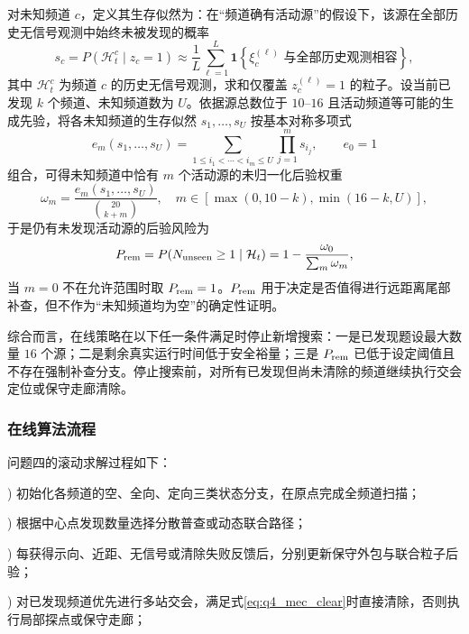 \documentclass[zihao=-4,a4paper,UTF8,fontset=none]{ctexart}
\begin{document}
对未知频道 $c$，定义其生存似然为：在“频道确有活动源”的假设下，该源在全部历史无信号观测中始终未被发现的概率
\begin{equation}
s_c=P(\mathcal H_t^c\mid z_c=1)
\approx\frac{1}{L}\sum_{\ell=1}^{L}
\mathbf 1\!\left\{\xi_c^{(\ell)}\text{ 与全部历史观测相容}\right\},
\label{eq:q4_survival}
\end{equation}
其中 $\mathcal H_t^c$ 为频道 $c$ 的历史无信号观测，求和仅覆盖 $z_c^{(\ell)}=1$ 的粒子。设当前已发现 $k$ 个频道、未知频道数为 $U$。依据源总数位于 $10$--$16$ 且活动频道等可能的生成先验，将各未知频道的生存似然 $s_1,\ldots,s_U$ 按基本对称多项式
\begin{equation}
e_m(s_1,\ldots,s_U)=\sum_{1\le i_1<\cdots<i_m\le U}\prod_{j=1}^{m}s_{i_j},\qquad e_0=1
\label{eq:q4_symmetric}
\end{equation}
组合，可得未知频道中恰有 $m$ 个活动源的未归一化后验权重
\begin{equation}
\omega_m=\frac{e_m(s_1,\ldots,s_U)}{\binom{20}{k+m}},
\quad m\in\left[\max(0,10-k),\min(16-k,U)\right],
\label{eq:q4_count_weight}
\end{equation}
于是仍有未发现活动源的后验风险为
\begin{equation}
P_{\rm rem}=P(N_{\rm unseen}\ge1\mid\mathcal H_t)=1-\frac{\omega_0}{\sum_m\omega_m},
\label{eq:q4_remaining_risk}
\end{equation}
当 $m=0$ 不在允许范围时取 $P_{\rm rem}=1$。$P_{\rm rem}$ 用于决定是否值得进行远距离尾部补查，但不作为“未知频道均为空”的确定性证明。

综合而言，在线策略在以下任一条件满足时停止新增搜索：一是已发现题设最大数量 $16$ 个源；二是剩余真实运行时间低于安全裕量；三是 $P_{\rm rem}$ 已低于设定阈值且不存在强制补查分支。停止搜索前，对所有已发现但尚未清除的频道继续执行交会定位或保守走廊清除。

\subsubsection{在线算法流程}

问题四的滚动求解过程如下：

) 初始化各频道的空、全向、定向三类状态分支，在原点完成全频道扫描；

) 根据中心点发现数量选择分散普查或动态联合路径；

) 每获得示向、近距、无信号或清除失败反馈后，分别更新保守外包与联合粒子后验；

) 对已发现频道优先进行多站交会，满足式\eqref{eq:q4_mec_clear}时直接清除，否则执行局部探点或保守走廊；
\end{document}
